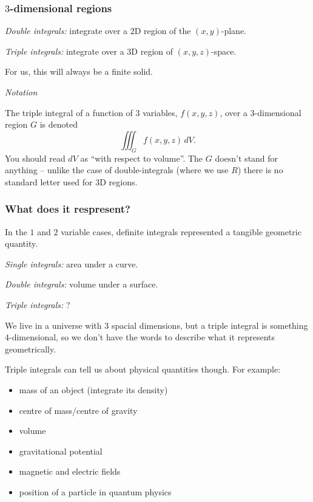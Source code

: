   \subsubsection*{$3$-dimensional regions}

  \emph{Double integrals:} integrate over a $2$D region of the $(x, y)$-plane.

  \emph{Triple integrals:} integrate over a $3$D region of $(x, y, z)$-space.

  For us, this will always be a finite solid.

  \emph{Notation}

  The triple integral of a function of $3$ variables, $f(x, y, z)$, over a $3$-dimensional region $G$ is denoted
    \[
      \iiint_G f(x, y, z) \, dV.
    \]
  You should read $dV$ as ``with respect to volume''.  The $G$ doesn't stand for anything -- unlike the case of double-integrals (where we use $R$) there is no standard letter used for $3$D regions.

  \subsubsection*{What does it respresent?}

  In the $1$ and $2$ variable cases, definite integrals represented a tangible geometric quantity.

  \emph{Single integrals:} area under a curve.

  \emph{Double integrals:} volume under a surface.

  \emph{Triple integrals:} ?

  We live in a universe with $3$ spacial dimensions, but a triple integral is something $4$-dimensional, so we don't have the words to describe what it represents geometrically.

  Triple integrals can tell us about physical quantities though.  For example:
    \begin{itemize}
      \item mass of an object (integrate its density)
      \item centre of mass/centre of gravity
      \item volume
      \item gravitational potential
      \item magnetic and electric fields
      \item position of a particle in quantum physics
    \end{itemize}

